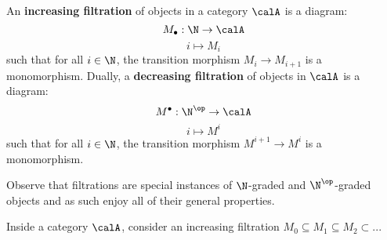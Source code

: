             \begin{definition}[Filtrations] \label{def: filtrations}
                An \textbf{increasing filtration} of objects in a category $\calA$ is a diagram:
                    $$M_{\bullet}: \N \to \calA$$
                    $$i \mapsto M_i$$
                such that for all $i \in \N$, the transition morphism $M_i \to M_{i + 1}$ is a monomorphism. Dually, a \textbf{decreasing filtration} of objects in $\calA$ is a diagram:
                    $$M^{\bullet}: \N^{\op} \to \calA$$
                    $$i \mapsto M^i$$
                such that for all $i \in \N$, the transition morphism $M^{i + 1} \to M^i$ is a monomorphism.
            \end{definition}
            \begin{remark}
                Observe that filtrations are special instances of $\N$-graded and $\N^{\op}$-graded objects and as such enjoy all of their general properties.
            \end{remark}
            \begin{definition} \label{def: associated_graded_objects}
                Inside a category $\calA$, consider an increasing filtration $M_0 \subseteq M_1 \subseteq M_2 \subset ...$ 
            \end{definition}